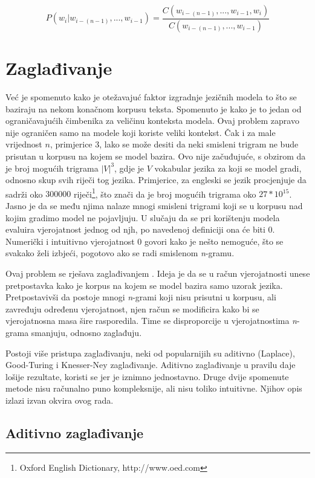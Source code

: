\documentclass[times, utf8, diplomski, numeric]{fer}
\begin{document}
\begin{equation}
P(w_i | w_{i - (n - 1)}, ... , w_{i - 1}) = \frac{C(w_{i - (n - 1)}, ... , w_{i - 1}, w_i)}{C(w_{i - (n - 1)}, ... , w_{i - 1})}
\end{equation}

\section{Zaglađivanje}

Već je spomenuto kako je otežavajuć faktor izgradnje jezičnih modela to što se baziraju na nekom konačnom korpusu teksta. Spomenuto je kako je to jedan od ograničavajućih čimbenika za veličinu konteksta modela. Ovaj problem zapravo nije ograničen samo na modele koji koriste veliki kontekst. Čak i za male vrijednost $n$, primjerice 3, lako se može desiti da neki smisleni trigram ne bude prisutan u korpusu na kojem se model bazira. Ovo nije začuđujuće, s obzirom da je broj mogućih trigrama $|V|^3$, gdje je $V$ vokabular jezika za koji se model gradi, odnosno skup svih riječi tog jezika. Primjerice, za engleski se jezik procjenjuje da sadrži oko $300 000$ riječi\footnote{Oxford English Dictionary, http://www.oed.com}, što znači da je broj mogućih trigrama oko $27 * 10^{15}$. Jasno je da se među njima nalaze mnogi smisleni trigrami koji se u korpusu nad kojim gradimo model ne pojavljuju. U slučaju da se pri korištenju modela evaluira vjerojatnost jednog od njh, po navedenoj definiciji ona će biti 0. Numerički i intuitivno vjerojatnost 0 govori kako je nešto nemoguće, što se svakako želi izbjeći, pogotovo ako se radi smislenom \textit{n}-gramu.

Ovaj problem se rješava zaglađivanjem . Ideja je da se u račun vjerojatnosti unese pretpostavka kako je korpus na kojem se model bazira samo uzorak jezika. Pretpostavivši da postoje mnogi \textit{n}-grami koji nisu prisutni u korpusu, ali zavređuju određenu vjerojatnost, njen račun se modificira kako bi se vjerojatnosna masa šire rasporedila. Time se disproporcije u vjerojatnostima \textit{n}-grama smanjuju, odnosno zaglađuju.

Postoji više pristupa zaglađivanju, neki od popularnijih su aditivno (Laplace), Good-Turing i Knesser-Ney zaglađivanje. Aditivno zaglađivanje u pravilu daje lošije rezultate, koristi se jer je iznimno jednostavno. Druge dvije spomenute metode nisu računalno puno kompleksnije, ali nisu toliko intuitivne. Njihov opis izlazi izvan okvira ovog rada.

\subsection{Aditivno zaglađivanje}
\end{document}
